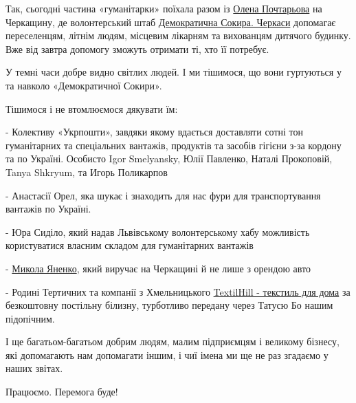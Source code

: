 
Так, сьогодні частина «гуманітарки» поїхала разом із \href{https://www.facebook.com/OlenaPochtaryova}{Олена Почтарьова} на
Черкащину, де волонтерський штаб \href{https://www.facebook.com/sokyra.space.ck}{Демократична Сокира. Черкаси} допомагає
переселенцям, літнім людям, місцевим лікарням та вихованцям дитячого будинку.
Вже від завтра допомогу зможуть отримати ті, хто її потребує.  


У темні часи добре видно світлих людей. І ми тішимося, що вони гуртуються у та
навколо «Демократичної Сокири». 

Тішимося і не втомлюємося дякувати їм: 

-  Колективу «Укрпошти», завдяки якому вдається доставляти сотні тон
гуманітарних та спеціальних вантажів, продуктів та засобів гігієни з-за кордону
та по Україні.  Особисто Igor Smelyansky, Юлії Павленко, Наталі Прокоповій,
Tanya Shkryum, та Игорь Поликарпов

-  Анастасії Орел, яка шукає і знаходить для нас фури для транспортування
вантажів по Україні.

-  Юра Сиділо, який надав Львівському волонтерському хабу можливість
користуватися власним складом для гуманітарних вантажів


-  \href{https://www.facebook.com/profile.php?id=100003663690368}{Микола
Яненко}, який виручає на Черкащині й не лише з орендою авто

-  Родині Тертичних та компанії з Хмельницького \href{https://www.facebook.com/textilhill/}{TextilHill - текстиль для дома}
за безкоштовну постільну білизну, турботливо передану через Татусю Бо нашим
підопічним. 


І ще багатьом-багатьом добрим людям, малим підприємцям і великому бізнесу, які
допомагають нам допомагати іншим, і чиї імена ми ще не раз згадаємо у наших
звітах. 

Працюємо. Перемога буде!


